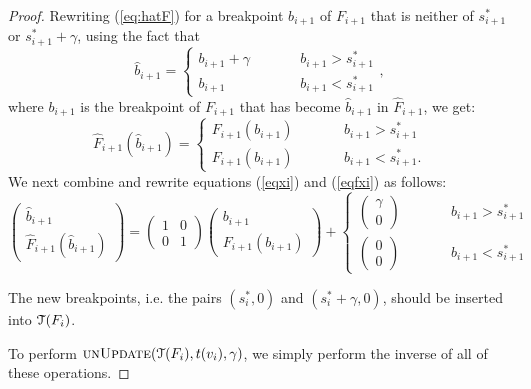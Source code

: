 \documentclass[11pt]{article}
\def\TT{\EuScript{T}}
\def\UnUpdate{\mathop{\textsc{unUpdate}}}
\newcommand{\hF}{\hat{F}}
\begin{document}
\begin{proof}
Rewriting (\ref{eq:hatF}) for a breakpoint $b_{i+1}$ of $F_{i+1}$ that is neither of $s^*_{i+1}$ or $s^*_{i+1} + \gamma$, using the fact that 
\begin{equation}\label{eqxi}
\hat{b}_{i+1} = \left\{\begin{array}{lll}b_{i+1} + \gamma & \qquad & b_{i+1} > s^*_{i+1}\\
b_{i+1} & &b_{i+1} < s^*_{i+1}
\end{array}\right.,
\end{equation}
where $b_{i+1}$ is the breakpoint of $F_{i+1}$ that has become $\hat{b}_{i+1}$ in $\hF_{i+1}$, we get:
\begin{equation}\label{eqfxi}
\hF_{i+1}(\hat{b}_{i+1}) =  \left\{\begin{array}{lll} F_{i+1}(b_{i+1}) & \qquad & b_{i+1} > s^*_{i+1} \\
F_{i+1}(b_{i+1}) && b_{i+1}< s^*_{i+1}. \end{array} \right.
\end{equation}
We next combine and rewrite equations (\ref{eqxi}) and (\ref{eqfxi}) as follows:
$$
\left(\begin{array}{c}\hat{b}_{i+1} \\ \hF_{i+1}(\hat{b}_{i+1})\end{array}\right) = \left(\begin{array}{cc} 1 & 0 \\ 0 & 1 \end{array}\right)\left(\begin{array}{c} b_{i+1} \\ F_{i+1}(b_{i+1}) \end{array}\right) + \left\{\begin{array}{lll}
\left(\begin{array}{c} \gamma \\ 0 \end{array}\right) & \qquad & b_{i+1} > s^*_{i+1} \\
\left(\begin{array}{c} 0 \\ 0 \end{array}\right) & \qquad & b_{i+1} < s^*_{i+1}
\end{array}\right.
$$

The new breakpoints, i.e. the pairs $(s^*_{i}, 0)$ and $(s^*_{i} + \gamma, 0)$, should be inserted into $\TT(F_{i})$. 

To perform $\UnUpdate(\TT(F_i),t(v_i), \gamma)$, we simply perform the inverse of all of these operations.  
\end{proof}
\end{document}
